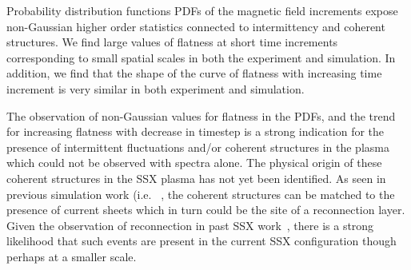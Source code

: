 \documentclass[12pt]{iopart}
\begin{document}
Probability distribution functions PDFs of the magnetic field increments expose non-Gaussian higher order statistics connected to intermittency and coherent structures.  We find large values of flatness at short time increments corresponding to small spatial scales in both the experiment and simulation.  In addition, we find that the shape of the curve of flatness with increasing time increment is very similar in both experiment and simulation.

The observation of non-Gaussian values for flatness in the PDFs, and the trend for increasing flatness with decrease in timestep is a strong indication for the presence of intermittent fluctuations and/or coherent structures in the plasma which could not be observed with spectra alone. The physical origin of these coherent structures in the SSX plasma has not yet been identified. As seen in previous simulation work (i.e. ~\cite{Servidio11b}, the coherent structures can be matched to the presence of current sheets which in turn could be the site of a reconnection layer. Given the observation of reconnection in past SSX work~\cite{Cothran09,Gray10}, there is a strong likelihood that such events are present in the current SSX configuration though perhaps at a smaller scale.
\end{document}
